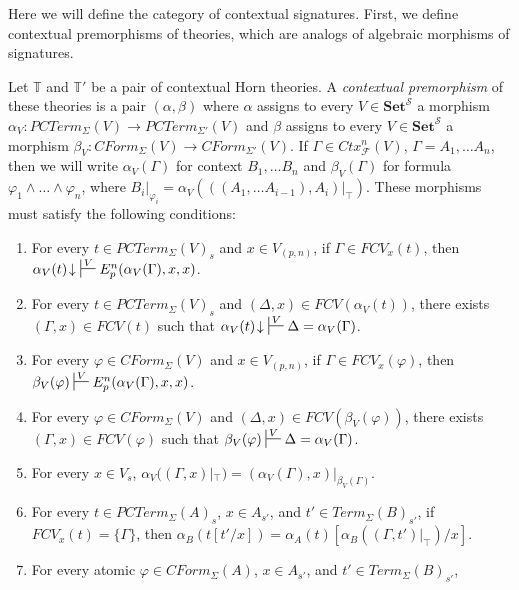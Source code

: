 \documentclass[reqno]{amsart}
\theoremstyle{definition}
\theoremstyle{remark}
\newcommand{\cat}[1]{\mathbf{#1}}
\newcommand{\Set}{\cat{Set}}
\numberwithin{figure}{section}
\begin{document}
Here we will define the category of contextual signatures.
First, we define contextual premorphisms of theories, which are analogs of algebraic morphisms of signatures.

\begin{defn}
Let $\mathbb{T}$ and $\mathbb{T}'$ be a pair of contextual Horn theories.
A \emph{contextual premorphism} of these theories is a pair $(\alpha,\beta)$ where $\alpha$ assigns to every $V \in \Set^\mathcal{S}$
a morphism $\alpha_V : PCTerm_\Sigma(V) \to PCTerm_{\Sigma'}(V)$
and $\beta$ assigns to every $V \in \Set^\mathcal{S}$ a morphism $\beta_V : CForm_\Sigma(V) \to CForm_{\Sigma'}(V)$.
If $\Gamma \in Ctx^n_\mathcal{F}(V)$, $\Gamma = A_1, \ldots A_n$, then we will write $\alpha_V(\Gamma)$ for context $B_1, \ldots B_n$ and
$\beta_V(\Gamma)$ for formula $\varphi_1 \land \ldots \land \varphi_n$, where $B_i|_{\varphi_i} = \alpha_V(((A_1, \ldots A_{i-1}), A_i)|_\top)$.
These morphisms must satisfy the following conditions:
\begin{enumerate}
\item For every $t \in PCTerm_\Sigma(V)_s$ and $x \in V_{(p,n)}$, if $\Gamma \in FCV_x(t)$, then $\alpha_V(t)\!\downarrow\ \sststile{}{V} E^n_p(\alpha_V(\Gamma),x,x)$.
\label{con-mor-a-fv-l}
\item For every $t \in PCTerm_\Sigma(V)_s$ and $(\Delta,x) \in FCV(\alpha_V(t))$,
    there exists $(\Gamma,x) \in FCV(t)$ such that $\alpha_V(t)\!\downarrow\ \sststile{}{V} \Delta = \alpha_V(\Gamma)$.
\label{con-mor-a-fv-r}
\item For every $\varphi \in CForm_\Sigma(V)$ and $x \in V_{(p,n)}$, if $\Gamma \in FCV_x(\varphi)$, then $\beta_V(\varphi) \sststile{}{V} E^n_p(\alpha_V(\Gamma),x,x)$.
\label{con-mor-b-fv-l}
\item For every $\varphi \in CForm_\Sigma(V)$ and $(\Delta,x) \in FCV(\beta_V(\varphi))$,
    there exists $(\Gamma,x) \in FCV(\varphi)$ such that $\beta_V(\varphi) \sststile{}{V} \Delta = \alpha_V(\Gamma)$.
\label{con-mor-b-fv-r}
\item For every $x \in V_s$, $\alpha_V((\Gamma,x)|_\top) = (\alpha_V(\Gamma),x)|_{\beta_V(\Gamma)}$.
\label{con-mor-a-var}
\item For every $t \in PCTerm_\Sigma(A)_s$, $x \in A_{s'}$, and $t' \in Term_\Sigma(B)_{s'}$,
    if $FCV_x(t) = \{ \Gamma \}$, then $\alpha_B(t[t'/x]) = \alpha_A(t)[\alpha_B((\Gamma,t')|_\top)/x]$.
\label{con-mor-a-subst}
\item For every atomic $\varphi \in CForm_\Sigma(A)$, $x \in A_{s'}$, and $t' \in Term_\Sigma(B)_{s'}$,

\end{enumerate}
\end{defn}
\end{document}
